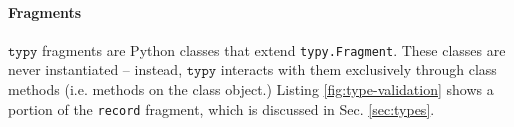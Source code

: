 \documentclass[preprint,10pt]{sigplanconf}
\newcommand{\typy}{\texttt{typy}}
\newcommand{\lip}[1]{\lstinline[language=Python,basicstyle=\ttfamily\footnotesize,deletendkeywords={tuple,buffer,map}]{#1}}
\begin{document}
\paragraph{Fragments}  $\typy$ fragments are Python classes that extend \lip{typy.Fragment}. These classes are never instantiated -- instead, $\typy$ interacts with them exclusively through class methods (i.e. methods on the class object.)  Listing \ref{fig:type-validation} shows a portion of the \lip{record} fragment, which is discussed in Sec. \ref{sec:types}. 




\end{document}
